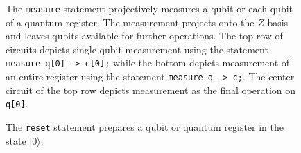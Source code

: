 \documentclass[USenglish,12pt,fleqn]{article} %
\newcommand*{\code}{\texttt}
\begin{document}
\begin{figure}
\begin{minipage}{.3\textwidth}
\centering
\end{minipage}
\begin{minipage}{.3\textwidth}
\centering
\end{minipage}
\begin{minipage}{.3\textwidth}
\centering
\end{minipage}

\begin{minipage}{.3\textwidth}
\centering
\end{minipage}
\begin{minipage}{.3\textwidth}
\centering
\end{minipage}
\begin{minipage}{.3\textwidth}
\centering
\end{minipage}
\caption{The \code{measure} statement projectively measures a qubit or each qubit of a quantum register. The measurement projects onto the $Z$-basis and leaves qubits available for further operations. The top row of circuits depicts single-qubit measurement using the statement \code{measure q[0] -> c[0];} while the bottom depicts measurement of an entire register using the statement \code{measure q -> c;}. The center circuit of the top row depicts measurement as the final operation on \code{q[0]}.
\label{fig:measure}}
\end{figure}

\begin{figure}
\begin{minipage}{.3\textwidth}
\centering

\end{minipage}
\begin{minipage}{.3\textwidth}
\centering
\end{minipage}
\begin{minipage}{.3\textwidth}
\centering
\end{minipage}
\caption{The \code{reset} statement prepares a qubit or quantum register in the state $|0\rangle$.
\label{fig:prepare}}
\end{figure}
\end{document}
